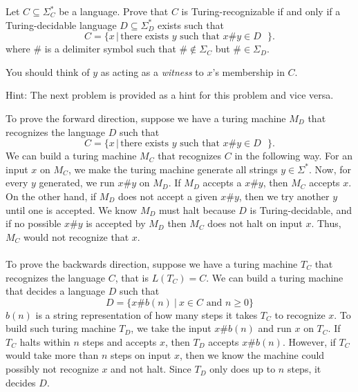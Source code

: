 
Let $C \subseteq \Sigma_C^{*}$ be a language.  
Prove that $C$ is Turing-recognizable if and only if a Turing-decidable language 
$D \subseteq \Sigma_D^{*}$ exists such that 
\[
C = \{ x \,|\, \mbox{there exists $y$ such that $x \# y  \in D$ } \}.
\]
where $\#$ is a delimiter symbol such that $\# \notin \Sigma_C$ but
$\# \in \Sigma_D$.

You should think of $y$ as acting as a {\em witness} to $x$'s membership in $C$.

Hint: The next problem is provided as a hint for this problem and vice versa.

\begin{solution}

To prove the forward direction, suppose we have a turing machine $M_D$ that recognizes the language $D$ such that 
\[
C = \{ x \,|\, \mbox{there exists $y$ such that $x \# y  \in D$ } \}.
\]
We can build a turing machine $M_C$ that recognizes $C$ in the following way. For an input $x$ on $M_C$, we make the turing machine generate all strings $y\in \Sigma^*$. Now, for every $y$ generated, we run $x\#y$ on $M_D$. If $M_D$ accepts a $x\#y$, then $M_C$ accepts $x$. On the other hand, if $M_D$ does not accept a given $x\#y$, then we try another $y$ until one is accepted. We know $M_D$ must halt because $D$ is Turing-decidable, and if no possible $x\#y$ is accepted by $M_D$ then $M_C$ does not halt on input $x$. Thus, $M_C$ would not recognize that $x$. \\
\\
To prove the backwards direction, suppose we have a turing machine $T_C$ that recognizes the language $C$, that is $L(T_C) = C$. We can build a turing machine that decides a language $D$ such that
\[
D = \{x\#b(n) ~|~ x\in C \mbox{ and  } n \ge 0\}
\]
$b(n)$ is a string representation of how many steps it takes $T_C$ to recognize $x$. To build such turing machine $T_D$, we take the input $x\#b(n)$ and run $x$ on $T_C$. If $T_C$ halts within $n$ steps and accepts $x$, then $T_D$ accepts $x\#b(n)$. However, if $T_C$ would take more than $n$ steps on input $x$, then we know the machine could possibly not recognize $x$ and not halt. Since $T_D$ only does up to $n$ steps, it decides $D$.
\end{solution}
